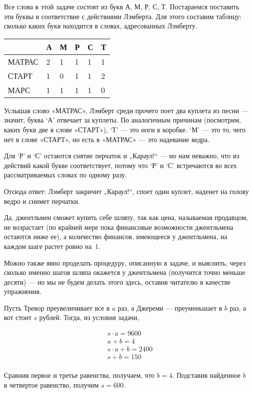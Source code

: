 ﻿

\begin{itemize}
\itA Все слова в этой задаче состоят из букв А, М, Р, С, Т. Постараемся поставить эти буквы в соответствие с действиями Лэмберта. Для этого составим таблицу: сколько каких букв находится в словах, адресованных Лэмберту.

\begin{center} \begin{tabular}{|l|l|l|l|l|l|}
\hline		& А & М & Р & С & Т \\ \hline
\ttfamily МАТРАС & 2 & 1 & 1 & 1 & 1 \\ \hline
\ttfamily СТАРТ & 1 & 0 & 1 & 1 & 2 \\ \hline
\ttfamily МАРС & 1 & 1 & 1 & 1 & 0 \\ \hline
\end{tabular} \end{center}

Услышав слово {\ttfamily «МАТРАС»}, Лэмберт среди прочего поет два куплета из песни — значит, буква `А' отвечает за куплеты. По аналогичным причинам (посмотрим, каких букв две в слове {\ttfamily «СТАРТ»}), `Т' — это ноги в коробке. `М' — это то, чего нет в слове {\ttfamily «СТАРТ»}, но есть в {\ttfamily «МАТРАС»} — это надевание ведра.

Для `Р' и `С' остаются снятие перчаток и „Караул!“ — но нам неважно, что из действий какой букве соответствует, потому что `Р' и `С' встречаются во всех рассматриваемых словах по одному разу.

Отсюда ответ: Лэмберт закричит „Караул!“, споет один куплет, наденет на голову ведро и снимет перчатки.

\itB Да, джентльмен сможет купить себе шляпу, так как цена, называемая продавцом, не возрастает (по крайней мере пока финансовые возможности джентльмена остаются ниже ее), а количество финансов, имеющееся у джентльмена, на каждом шаге растет ровно на~1.

Можно также явно проделать процедуру, описанную в задаче, и выяснить, через сколько именно шагов шляпа окажется у джентльмена (получится точно меньше десяти) — но мы не будем делать этого здесь, оставив читателю в качестве упражнения.

\itC Пусть Тревор преувеличивает все в $a$ раз, а Джереми — преуменьшает в $b$ раз, а кот стоит $s$ рублей. Тогда, из условия задачи,

\begin{align*}
	& s \cdot a = 9600 \\
	& a \div b = 4 \\
	& s \cdot a \div b = 2400 \\
	& s \div b = 150 \\
\end{align*}

\vspace{-0.4cm}
Сравнив первое и третье равенства, получаем, что $b=4$. Подставив найденное $b$ в четвертое равенство, получим $s=600$.

\end{itemize}
